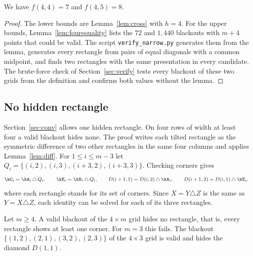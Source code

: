\begin{corollary}\label{cor:fourboundary}
We have $f(4,4)=7$ and $f(4,5)=8$.
\end{corollary}

\begin{proof}
The lower bounds are Lemma~\ref{lem:cross} with $h=4$. For the upper bounds, Lemma~\ref{lem:fourequality} lists the $72$ and $1{,}440$ blackouts with $m+4$ points that could be valid. The script \texttt{verify\_narrow.py} generates them from the lemma, generates every rectangle from pairs of equal diagonals with a common midpoint, and finds two rectangles with the same presentation in every candidate. The brute-force check of Section~\ref{sec:verify} tests every blackout of these two grids from the definition and confirms both values without the lemma.
\end{proof}

\subsection{No hidden rectangle}

Section~\ref{sec:conv} allows one hidden rectangle. On four rows of width at least four a valid blackout hides none. The proof writes each tilted rectangle as the symmetric difference of two other rectangles in the same four columns and applies Lemma~\ref{lem:diff}. For $1\le i\le m-3$ let $Q_i=\{(i,2),(i,3),(i+3,2),(i+3,3)\}$. Checking corners gives
\begin{equation}\label{eq:fourxor}
\kC_i=\kA_i\,\triangle\,Q_i,\qquad \kE_i=\kB_i\,\triangle\,Q_i,\qquad
D(i+1,1)=D(i,2)\,\triangle\,\kA_i,\qquad D(i+1,2)=D(i,1)\,\triangle\,\kE_i,
\end{equation}
where each rectangle stands for its set of corners. Since $X=Y\triangle Z$ is the same as $Y=X\triangle Z$, each identity can be solved for each of its three rectangles.

\begin{theorem}\label{thm:hidden}
Let $m\ge4$. A valid blackout of the $4\times m$ grid hides no rectangle, that is, every rectangle shows at least one corner. For $m=3$ this fails. The blackout $\{(1,2),(2,1),(3,2),(2,3)\}$ of the $4\times3$ grid is valid and hides the diamond $D(1,1)$.
\end{theorem}

